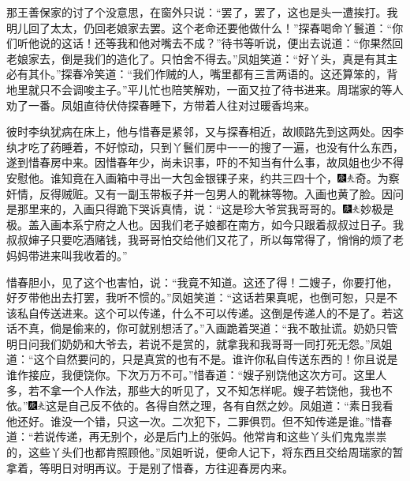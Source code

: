 那王善保家的讨了个没意思，在窗外只说：``罢了，罢了，这也是头一遭挨打。我明儿回了太太，仍回老娘家去罢。这个老命还要他做什么！''探春喝命丫鬟道：``你们听他说的这话！还等我和他对嘴去不成？''待书等听说，便出去说道：``你果然回老娘家去，倒是我们的造化了。只怕舍不得去。''凤姐笑道：``好丫头，真是有其主必有其仆。''探春冷笑道：``我们作贼的人，嘴里都有三言两语的。这还算笨的，背地里就只不会调唆主子。''平儿忙也陪笑解劝，一面又拉了待书进来。周瑞家的等人劝了一番。凤姐直待伏侍探春睡下，方带着人往对过暖香坞来。

彼时李纨犹病在床上，他与惜春是紧邻，又与探春相近，故顺路先到这两处。因李纨才吃了药睡着，不好惊动，只到丫鬟们房中一一的搜了一遍，也没有什么东西，遂到惜春房中来。因惜春年少，尚未识事，吓的不知当有什么事，故凤姐也少不得安慰他。谁知竟在入画箱中寻出一大包金银锞子来，约共三四十个，{\includegraphics[width=3mm]{../Images/00004}\includegraphics[width=3mm]{../Images/00012}\footnotesize \kaishu 奇。为察奸情，反得贼赃。}又有一副玉带板子并一包男人的靴袜等物。入画也黄了脸。因问是那里来的，入画只得跪下哭诉真情，说：``这是珍大爷赏我哥哥的。{\includegraphics[width=3mm]{../Images/00004}\includegraphics[width=3mm]{../Images/00012}\footnotesize \kaishu 妙极是极。盖入画本系宁府之人也。}因我们老子娘都在南方，如今只跟着叔叔过日子。我叔叔婶子只要吃酒赌钱，我哥哥怕交给他们又花了，所以每常得了，悄悄的烦了老妈妈带进来叫我收着的。''

惜春胆小，见了这个也害怕，说：``我竟不知道。这还了得！二嫂子，你要打他，好歹带他出去打罢，我听不惯的。''凤姐笑道：``这话若果真呢，也倒可恕，只是不该私自传送进来。这个可以传递，什么不可以传递。这倒是传递人的不是了。若这话不真，倘是偷来的，你可就别想活了。''入画跪着哭道：``我不敢扯谎。奶奶只管明日问我们奶奶和大爷去，若说不是赏的，就拿我和我哥哥一同打死无怨。''凤姐道：``这个自然要问的，只是真赏的也有不是。谁许你私自传送东西的！你且说是谁作接应，我便饶你。下次万万不可。''惜春道：``嫂子别饶他这次方可。这里人多，若不拿一个人作法，那些大的听见了，又不知怎样呢。嫂子若饶他，我也不依。''{\includegraphics[width=3mm]{../Images/00004}\includegraphics[width=3mm]{../Images/00012}\footnotesize \kaishu 这是自己反不依的。各得自然之理，各有自然之妙。}凤姐道：``素日我看他还好。谁没一个错，只这一次。二次犯下，二罪俱罚。但不知传递是谁。''惜春道：``若说传递，再无别个，必是后门上的张妈。他常肯和这些丫头们鬼鬼祟祟的，这些丫头们也都肯照顾他。''凤姐听说，便命人记下，将东西且交给周瑞家的暂拿着，等明日对明再议。于是别了惜春，方往迎春房内来。

